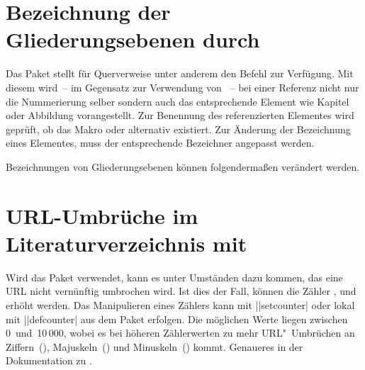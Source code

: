 \section{%
  Bezeichnung der Gliederungsebenen durch %
  \label{sec:tips:references}%
}
%
%
Das Paket  stellt für Querverweise unter anderem den Befehl 
 zur Verfügung. Mit diesem wird~-- im Gegensatz 
zur Verwendung von ~-- bei einer Referenz nicht nur die Nummerierung 
selber sondern auch das entsprechende Element wie Kapitel oder Abbildung 
vorangestellt. Zur Benennung des referenzierten Elementes wird geprüft, ob das 
Makro  oder alternativ 
 existiert. Zur Änderung der Bezeichnung eines 
Elementes, muss der entsprechende Bezeichner angepasst werden.
%
\begin{Example}
Bezeichnungen von Gliederungsebenen können folgendermaßen verändert werden.
\begin{Code}
\end{Code}
\end{Example}



\section{%
  URL-Umbrüche im Literaturverzeichnis mit %
}
%
%
Wird das Paket  verwendet, kann es unter Umständen dazu 
kommen, das eine URL nicht vernünftig umbrochen wird. Ist dies der Fall, 
können die Zähler ,  und 
 erhöht werden. Das Manipulieren eines Zählers kann 
mit \Macro||{setcounter|} oder lokal mit 
\Macro||{defcounter|} aus dem Paket  erfolgen. 
Die möglichen Werte liegen zwischen 0~und~10\,000, wobei es bei höheren 
Zählerwerten zu mehr URL"~Umbrüchen an Ziffern~(), 
Majuskeln~() und Minuskeln~() 
kommt. Genaueres in der Dokumentation zu .



